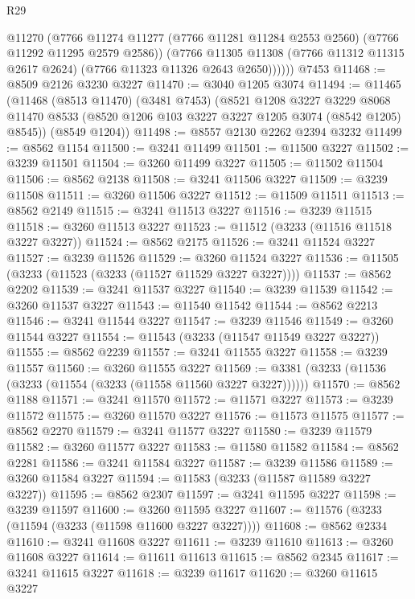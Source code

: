 \begin{lexlean}{R29}
\begin{coremodule}
            @11270
            (@7766
              @11274
              @11277
              (@7766 @11281 @11284 @2553 @2560)
              (@7766 @11292 @11295 @2579 @2586))
            (@7766
              @11305
              @11308
              (@7766 @11312 @11315 @2617 @2624)
              (@7766 @11323 @11326 @2643 @2650))))))
    @7453
@11468 := @8509 @2126 @3230 @3227
@11470 := @3040 @1205 @3074
@11494 := @11465
    (@11468
      (@8513 @11470)
      (@3481 @7453)
      (@8521
        @1208
        @3227
        @3229
        @8068
        @11470
        @8533
        (@8520 @1206 @103 @3227 @3227 @1205 @3074 (@8542 @1205) @8545))
      (@8549 @1204))
@11498 := @8557 @2130 @2262 @2394 @3232
@11499 := @8562 @1154
@11500 := @3241 @11499
@11501 := @11500 @3227
@11502 := @3239 @11501
@11504 := @3260 @11499 @3227
@11505 := @11502 @11504
@11506 := @8562 @2138
@11508 := @3241 @11506 @3227
@11509 := @3239 @11508
@11511 := @3260 @11506 @3227
@11512 := @11509 @11511
@11513 := @8562 @2149
@11515 := @3241 @11513 @3227
@11516 := @3239 @11515
@11518 := @3260 @11513 @3227
@11523 := @11512 (@3233 (@11516 @11518 @3227 @3227))
@11524 := @8562 @2175
@11526 := @3241 @11524 @3227
@11527 := @3239 @11526
@11529 := @3260 @11524 @3227
@11536 := @11505 (@3233 (@11523 (@3233 (@11527 @11529 @3227 @3227))))
@11537 := @8562 @2202
@11539 := @3241 @11537 @3227
@11540 := @3239 @11539
@11542 := @3260 @11537 @3227
@11543 := @11540 @11542
@11544 := @8562 @2213
@11546 := @3241 @11544 @3227
@11547 := @3239 @11546
@11549 := @3260 @11544 @3227
@11554 := @11543 (@3233 (@11547 @11549 @3227 @3227))
@11555 := @8562 @2239
@11557 := @3241 @11555 @3227
@11558 := @3239 @11557
@11560 := @3260 @11555 @3227
@11569 := @3381 (@3233 (@11536 (@3233 (@11554 (@3233 (@11558 @11560 @3227 @3227))))))
@11570 := @8562 @1188
@11571 := @3241 @11570
@11572 := @11571 @3227
@11573 := @3239 @11572
@11575 := @3260 @11570 @3227
@11576 := @11573 @11575
@11577 := @8562 @2270
@11579 := @3241 @11577 @3227
@11580 := @3239 @11579
@11582 := @3260 @11577 @3227
@11583 := @11580 @11582
@11584 := @8562 @2281
@11586 := @3241 @11584 @3227
@11587 := @3239 @11586
@11589 := @3260 @11584 @3227
@11594 := @11583 (@3233 (@11587 @11589 @3227 @3227))
@11595 := @8562 @2307
@11597 := @3241 @11595 @3227
@11598 := @3239 @11597
@11600 := @3260 @11595 @3227
@11607 := @11576 (@3233 (@11594 (@3233 (@11598 @11600 @3227 @3227))))
@11608 := @8562 @2334
@11610 := @3241 @11608 @3227
@11611 := @3239 @11610
@11613 := @3260 @11608 @3227
@11614 := @11611 @11613
@11615 := @8562 @2345
@11617 := @3241 @11615 @3227
@11618 := @3239 @11617
@11620 := @3260 @11615 @3227

\end{coremodule}
\end{lexlean}
